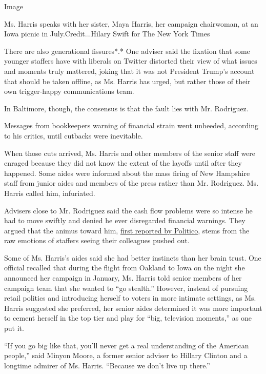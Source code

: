 Image

Ms. Harris speaks with her sister, Maya Harris, her campaign chairwoman,
at an Iowa picnic in July.Credit...Hilary Swift for The New York Times

There are also generational fissures*.* One adviser said the fixation
that some younger staffers have with liberals on Twitter distorted their
view of what issues and moments truly mattered, joking that it was not
President Trump's account that should be taken offline, as Ms. Harris
has urged, but rather those of their own trigger-happy communications
team.

In Baltimore, though, the consensus is that the fault lies with Mr.
Rodriguez.

Messages from bookkeepers warning of financial strain went unheeded,
according to his critics, until cutbacks were inevitable.

When those cuts arrived, Ms. Harris and other members of the senior
staff were enraged because they did not know the extent of the layoffs
until after they happened. Some aides were informed about the mass
firing of New Hampshire staff from junior aides and members of the press
rather than Mr. Rodriguez. Ms. Harris called him, infuriated.

Advisers close to Mr. Rodriguez said the cash flow problems were so
intense he had to move swiftly and denied he ever disregarded financial
warnings. They argued that the animus toward him,
\href{https://www.politico.com/news/2019/11/15/kamala-harris-campaign-2020-071105}{first
reported by Politico}, stems from the raw emotions of staffers seeing
their colleagues pushed out.

Some of Ms. Harris's aides said she had better instincts than her brain
trust. One official recalled that during the flight from Oakland to Iowa
on the night she announced her campaign in January, Ms. Harris told
senior members of her campaign team that she wanted to ``go stealth.''
However, instead of pursuing retail politics and introducing herself to
voters in more intimate settings, as Ms. Harris suggested she preferred,
her senior aides determined it was more important to cement herself in
the top tier and play for ``big, television moments,'' as one put it.

``If you go big like that, you'll never get a real understanding of the
American people,'' said Minyon Moore, a former senior adviser to Hillary
Clinton and a longtime admirer of Ms. Harris. ``Because we don't live up
there.''


